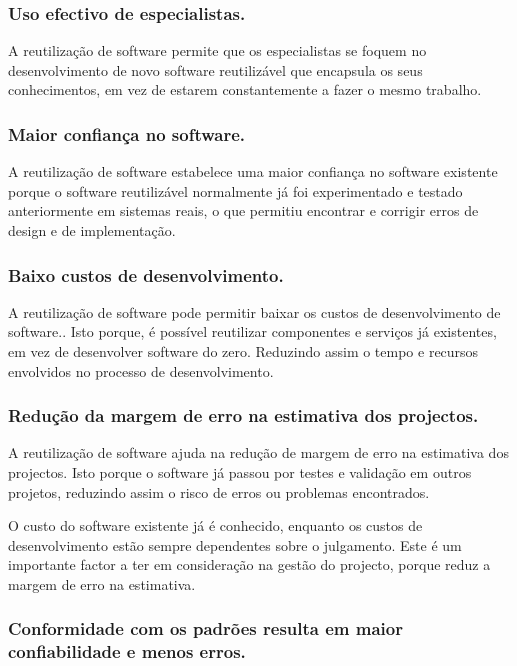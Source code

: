 \documentclass[runningheads]{llncs}
\begin{document}
\subsubsection{Uso efectivo de especialistas.}

A reutilização de software permite que os especialistas se foquem no desenvolvimento de novo software reutilizável que encapsula os seus conhecimentos, em vez de estarem constantemente a fazer o mesmo trabalho.

\subsubsection{Maior confiança no software.}

A reutilização de software estabelece uma maior confiança no software existente porque o software reutilizável normalmente já foi experimentado e testado anteriormente em sistemas reais, o que permitiu encontrar e corrigir erros de design e de implementação.

\subsubsection{Baixo custos de desenvolvimento.}

A reutilização de software pode permitir baixar os custos de desenvolvimento de software.. Isto porque, é possível reutilizar componentes e serviços já existentes, em vez de desenvolver software do zero. Reduzindo assim o tempo e recursos envolvidos no processo de desenvolvimento.  


\subsubsection{Redução da margem de erro na estimativa dos projectos.}

A reutilização de software ajuda na redução de margem de erro na estimativa dos projectos. Isto porque o software já passou por testes e validação em outros projetos, reduzindo assim o risco de erros ou problemas encontrados.\par
O custo do software existente já é conhecido, enquanto os custos de desenvolvimento estão sempre dependentes sobre o julgamento. Este é um importante factor a ter em consideração na gestão do projecto, porque reduz a margem de erro na estimativa.


\subsubsection{Conformidade com os padrões resulta em maior confiabilidade e menos erros.}
\end{document}
